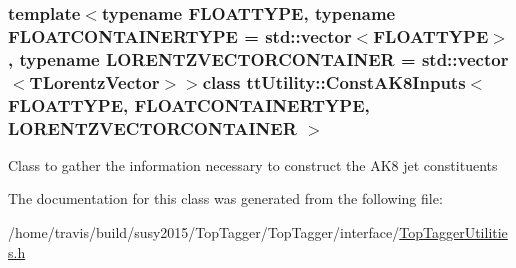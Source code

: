 \subsubsection*{template$<$typename F\-L\-O\-A\-T\-T\-Y\-P\-E, typename F\-L\-O\-A\-T\-C\-O\-N\-T\-A\-I\-N\-E\-R\-T\-Y\-P\-E = std\-::vector$<$\-F\-L\-O\-A\-T\-T\-Y\-P\-E$>$, typename L\-O\-R\-E\-N\-T\-Z\-V\-E\-C\-T\-O\-R\-C\-O\-N\-T\-A\-I\-N\-E\-R = std\-::vector$<$\-T\-Lorentz\-Vector$>$$>$class tt\-Utility\-::\-Const\-A\-K8\-Inputs$<$ F\-L\-O\-A\-T\-T\-Y\-P\-E, F\-L\-O\-A\-T\-C\-O\-N\-T\-A\-I\-N\-E\-R\-T\-Y\-P\-E, L\-O\-R\-E\-N\-T\-Z\-V\-E\-C\-T\-O\-R\-C\-O\-N\-T\-A\-I\-N\-E\-R $>$}

Class to gather the information necessary to construct the A\-K8 jet constituents 

The documentation for this class was generated from the following file\-:\begin{DoxyCompactItemize}
\item 
/home/travis/build/susy2015/\-Top\-Tagger/\-Top\-Tagger/interface/\hyperlink{TopTaggerUtilities_8h}{Top\-Tagger\-Utilities.\-h}\end{DoxyCompactItemize}
